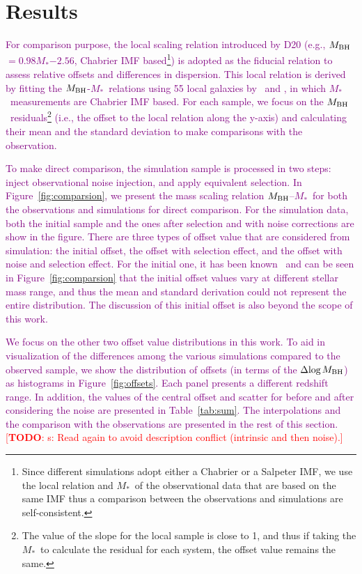\documentclass[twocolumn]{aastex631}
\newcommand{\todo}[1]{\textcolor{red}{[{\bf TODO}: #1]}}
\newcommand{\red}[1]{\textcolor{purple}{#1}}
\def\smass{{$M_*$}}
\def\mbh{$M_{\rm BH}$}
\begin{document}
\section{Results} \label{sec:result}
\red{For comparison purpose, the local scaling relation introduced by D20 (e.g., \mbh$=0.98$\smass$-2.56$, Chabrier IMF based\footnote{Since different simulations adopt either a Chabrier or a Salpeter IMF, we use the local relation and \smass\ of the observational data that are based on the same IMF thus a comparison between the observations and simulations are self-consistent.}) is adopted as the fiducial relation to assess relative offsets and differences in dispersion. This local relation is derived by fitting the \mbh-\smass\ relations using 55 local galaxies by~\citet{Bennert++2011} and \citet{H+R04}, in which \smass\ measurements are Chabrier IMF based.}
\red{For each sample, we focus on the \mbh\ residuals\footnote{The value of the slope for the local sample is close to 1, and thus if taking the \smass\ to calculate the residual for each system, the offset value remains the same.} (i.e., the offset to the local relation along the y-axis) and calculating their mean and the standard deviation to make comparisons with the observation.}

\red{To make direct comparison, the simulation sample is processed in two steps: inject observational noise injection, and apply equivalent selection. In Figure~\ref{fig:comparsion}, we present the mass scaling relation \mbh--\smass\ for both the observations and simulations for direct comparison. For the simulation data, both the initial sample and the ones after selection and with noise corrections are show in the figure. There are three types of offset value that are considered from simulation: the initial offset, the offset with selection effect, and the offset with noise and selection effect. For the initial one, it has been known~\citep[e.g.,][Figure 2]{Habouzit2021} and can be seen in Figure~\ref{fig:comparsion} that the initial offset values vary at different stellar mass range, and thus the mean and standard derivation could not represent the entire distribution. The discussion of this initial offset is also beyond the scope of this work.}

\red{We focus on the other two offset value distributions in this work. To aid in visualization of the differences among the various simulations compared to the observed sample, we show the distribution of offsets (in terms of the $\Delta{\rm log}$\mbh) as histograms in Figure~\ref{fig:offsets}.  Each panel presents a different redshift range. In addition, the values of the central offset and scatter for before and after considering the noise are presented in Table~\ref{tab:sum}. The interpolations and the comparison with the observations are presented in the rest of this section.}
\todo{s: Read again to avoid description conflict (intrinsic and then noise).}
\end{document}
